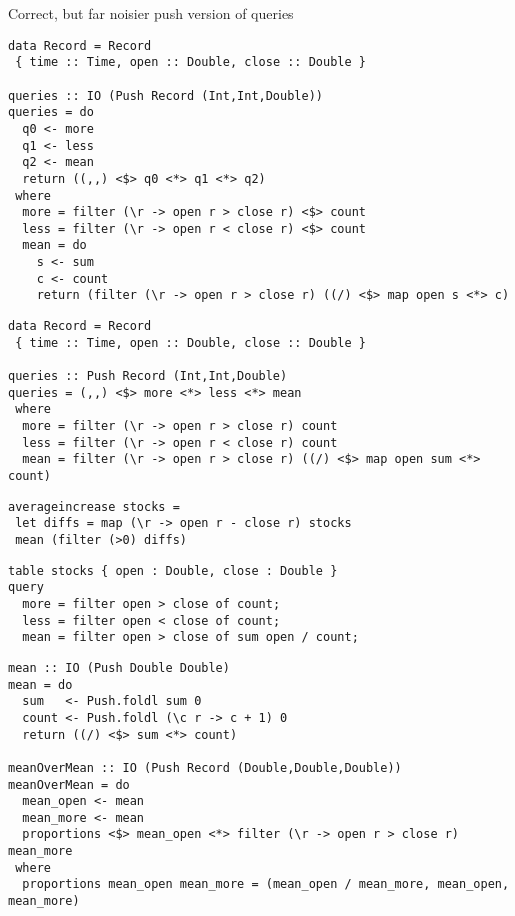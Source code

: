 Correct, but far noisier push version of queries
\begin{lstlisting}
data Record = Record
 { time :: Time, open :: Double, close :: Double }

queries :: IO (Push Record (Int,Int,Double))
queries = do
  q0 <- more
  q1 <- less
  q2 <- mean
  return ((,,) <$> q0 <*> q1 <*> q2)
 where
  more = filter (\r -> open r > close r) <$> count
  less = filter (\r -> open r < close r) <$> count
  mean = do
    s <- sum
    c <- count
    return (filter (\r -> open r > close r) ((/) <$> map open s <*> c)
\end{lstlisting}

\begin{lstlisting}
data Record = Record
 { time :: Time, open :: Double, close :: Double }

queries :: Push Record (Int,Int,Double)
queries = (,,) <$> more <*> less <*> mean
 where
  more = filter (\r -> open r > close r) count
  less = filter (\r -> open r < close r) count
  mean = filter (\r -> open r > close r) ((/) <$> map open sum <*> count)
\end{lstlisting}

\begin{lstlisting}
averageincrease stocks =
 let diffs = map (\r -> open r - close r) stocks
 mean (filter (>0) diffs)
\end{lstlisting}

\begin{lstlisting}
table stocks { open : Double, close : Double }
query 
  more = filter open > close of count;
  less = filter open < close of count;
  mean = filter open > close of sum open / count;
\end{lstlisting}

\begin{lstlisting}
mean :: IO (Push Double Double)
mean = do
  sum   <- Push.foldl sum 0
  count <- Push.foldl (\c r -> c + 1) 0
  return ((/) <$> sum <*> count)

meanOverMean :: IO (Push Record (Double,Double,Double))
meanOverMean = do
  mean_open <- mean
  mean_more <- mean
  proportions <$> mean_open <*> filter (\r -> open r > close r) mean_more
 where
  proportions mean_open mean_more = (mean_open / mean_more, mean_open, mean_more)
\end{lstlisting}

